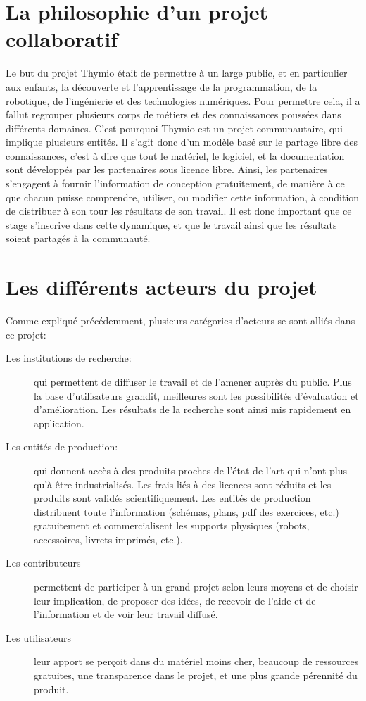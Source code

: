 \documentclass[a4paper, 12pt]{report}
\begin{document}
\section{La philosophie d'un projet collaboratif \cite{PhiloThymio} }
\label{PhiloThymio}
Le but du projet Thymio \pageref{thymio} était de permettre à un large public, et en particulier aux enfants, la découverte et l'apprentissage de la programmation, de la robotique, de l'ingénierie et des technologies numériques. Pour permettre cela, il a fallut regrouper plusieurs corps de métiers et des connaissances poussées dans différents domaines. C'est pourquoi Thymio \pageref{thymio} est un projet communautaire, qui implique plusieurs entités. Il s'agit donc d'un modèle basé sur le partage libre des connaissances, c'est à dire que tout le matériel, le logiciel, et la documentation sont développés par les partenaires sous licence libre. Ainsi, les partenaires s'engagent à fournir l'information de conception gratuitement, de manière à ce que chacun puisse comprendre, utiliser, ou modifier cette information, à condition de distribuer à son tour les résultats de son travail. Il est donc important que ce stage s'inscrive dans cette dynamique, et que le travail ainsi que les résultats soient partagés à la communauté.

\section{Les différents acteurs du projet}
Comme expliqué précédemment, plusieurs catégories d'acteurs se sont alliés dans ce projet:
\begin{description}
\item[Les institutions de recherche: ]qui permettent de diffuser le travail et de l'amener auprès du public. Plus la base d'utilisateurs grandit, meilleures sont les possibilités d'évaluation et d'amélioration. Les résultats de la recherche sont ainsi mis rapidement en application.
\item[Les entités de production: ] qui donnent accès à des produits proches de l'état de l'art qui n'ont plus qu'à être industrialisés. Les frais liés à des licences sont réduits et les produits sont validés scientifiquement. Les entités de production distribuent toute l'information (schémas, plans, pdf des exercices, etc.) gratuitement et commercialisent les supports physiques (robots, accessoires, livrets imprimés, etc.).
\item[Les contributeurs] permettent de participer à un grand projet selon leurs moyens et de choisir leur implication, de proposer des idées, de recevoir de l'aide et de l'information et de voir leur travail diffusé.
\item[Les utilisateurs] leur apport se perçoit dans du matériel moins cher, beaucoup de ressources gratuites, une transparence dans le projet, et une plus grande pérennité du produit.
\end{description}
\end{document}
